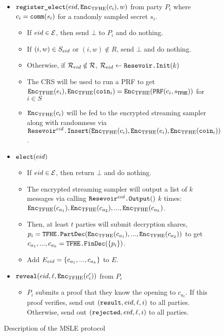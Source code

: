 \begin{figure}
{\begin{minipage}{1\textwidth}
\begin{itemize}
				\item $\texttt{register\_elect}({eid}, \texttt{Enc}_{\mathrm{TFHE}}(c_i), w)$ from party $P_i$ where $c_i = \texttt{comm}(s_i)$ for a randomly sampled secret $s_i$.
				      \begin{itemize}
					      \item If ${eid} \in \mathcal{E}$, then send $\bot$ to $P_i$ and do nothing.
					      \item If $(i, w) \in S_{eid}$ or $(i, w) \notin R$, send $\bot$ and do nothing.
					      \item Otherwise, if $\mathcal{R}_{eid} \notin \mathcal{R}$, $\mathcal{R}_{eid} \gets \texttt{Resevoir.Init}(k)$
					      \item The CRS will be used to run a PRF to get $\texttt{Enc}_{\mathrm{TFHE}}(e_i), \texttt{Enc}_{\mathrm{TFHE}}(\texttt{coin}_i) = \texttt{Enc}_{\mathrm{TFHE}}(\texttt{PRF}(c_i, s_\texttt{TFHE}))$ for $i \in S$
					      \item $\texttt{Enc}_{\mathrm{TFHE}}(c_i)$ will be fed to the encrypted streaming sampler along with randomness via
					            $\texttt{Resevoir}^{{eid}}\texttt{.Insert}(\texttt{Enc}_{\mathrm{TFHE}}(c_i), \texttt{Enc}_{\mathrm{TFHE}}(e_i), \texttt{Enc}_{\mathrm{TFHE}}(\texttt{coin}_i))$.
				      \end{itemize}

				\item $\texttt{elect}({eid})$
				      \begin{itemize}
					      \item If ${eid} \in \mathcal{E}$, then return $\bot$ and do nothing.
					      \item The encrypted streaming sampler will output a list of $k$ messages via calling $\texttt{Resevoir}^{{eid}}\texttt{.Output}()$ $k$ times: $\texttt{Enc}_{\mathrm{TFHE}}(c_{a_1}), \texttt{Enc}_{\mathrm{TFHE}}(c_{a_2}), ..., \texttt{Enc}_{\mathrm{TFHE}}(c_{a_k})$.
					      \item Then, at least $t$ parties will submit decryption shares, $p_i = \texttt{TFHE.PartDec}(\texttt{Enc}_{\mathrm{TFHE}}(c_{a_1}), ..., \texttt{Enc}_{\mathrm{TFHE}}(c_{a_2}))$ to get $c_{a_1}, ..., c_{a_k} = \texttt{TFHE.FinDec}(\{p_i\})$.
					      \item Add $E_{eid} = \left\{c_{a_1}, ..., c_{a_k}\right\}$ to $E$.
				      \end{itemize}
				\item $\texttt{reveal}({eid}, \ell, \texttt{Enc}_{\mathrm{TFHE}}(c'_i))$ from $P_i$
				      \begin{itemize}
					      \item $P_i$ submits a proof that they know the opening to $c_{a_\ell}$.
					            If this proof verifies, send out $(\texttt{result}, {eid}, \ell, i)$ to all parties.
					            Otherwise, send out $(\texttt{rejected}, {eid}, \ell, i)$ to all parties.
				      \end{itemize}
			\end{itemize}
		\end{minipage}
	}
	\caption{Description of the MSLE protocol}
	\label{fig:protocolMSLE}
\end{figure}



